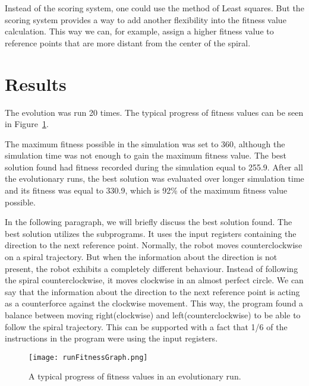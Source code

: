 \documentclass{ExcelAtFIT}
\begin{document}
Instead of the scoring system, one could use the method of Least squares.
But the scoring system provides a way to add another flexibility into the fitness value calculation.
This way we can, for example, assign a higher fitness value to reference points that are more distant from the center of the spiral.




\section{Results}
The evolution was run 20 times.
The typical progress of fitness values can be seen in Figure~\ref{fig:FitnessGraph}.

The maximum fitness possible in the simulation was set to 360, although the simulation time was not enough to gain the maximum fitness value.
The best solution found had fitness recorded during the simulation equal to 255.9.
After all the evolutionary runs, the best solution was evaluated over longer simulation time and its fitness was equal to 330.9, which is 92\% of the maximum fitness value possible.

In the following paragraph, we will briefly discuss the best solution found.
The best solution utilizes the subprograms.
It uses the input registers containing the direction to the next reference point.
Normally, the robot moves counterclockwise on a spiral trajectory.
But when the information about the direction is not present, the robot exhibits a completely different behaviour.
Instead of following the spiral counterclockwise, it moves clockwise in an almost perfect circle.
We can say that the information about the direction to the next reference point is acting as a counterforce against the clockwise movement.
This way, the program found a balance between moving right(clockwise) and left(counterclockwise) to be able to follow the spiral trajectory.
This can be supported with a fact that 1/6 of the instructions in the program were using the input registers.


\begin{figure}[h]
	\centering
	{\texttt{[image: runFitnessGraph.png]}}
	\caption{
		A typical progress of fitness values in an evolutionary run.
	}
	\label{fig:FitnessGraph}
\end{figure}
\end{document}
